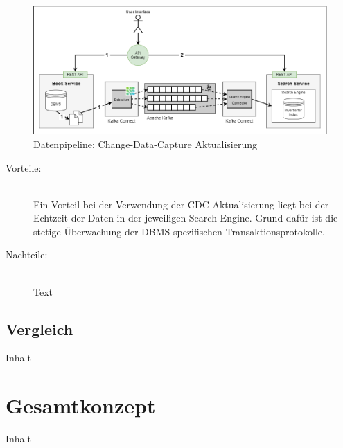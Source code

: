 \begin{figure}[H]
    \centering
    \includegraphics[width=0.9\linewidth]{images/CDC_aktualisierung.png}
    \caption{Datenpipeline: Change-Data-Capture Aktualisierung}
    \label{fig:changedatacapture_aktualisierung}
\end{figure}

\begin{description}
    \item[Vorteile:]\hfill \\
    Ein Vorteil bei der Verwendung der CDC-Aktualisierung liegt bei der Echtzeit der Daten in der jeweiligen Search Engine. Grund dafür ist die stetige Überwachung der DBMS-spezifischen Transaktionsprotokolle.
    
    \item[Nachteile:]\hfill \\
    Text

\end{description}

\subsection{Vergleich\label{subsec4.3.5:Unterunterpunkt-5}}

Inhalt

\section{Gesamtkonzept\label{sec4.4:Unterpunkt-4}}

Inhalt

